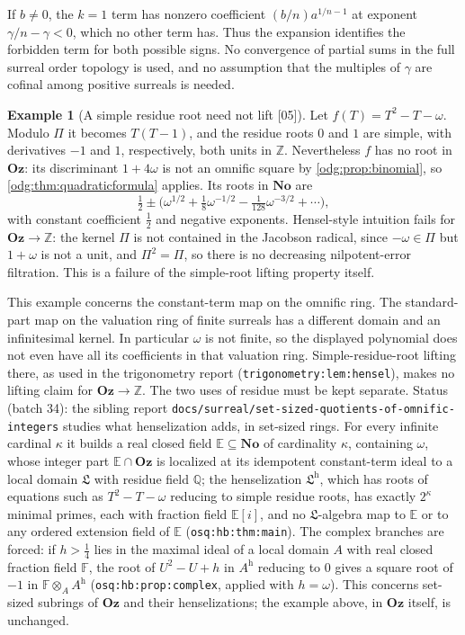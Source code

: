 \documentclass[11pt,oneside]{article}
\numberwithin{equation}{section}
\theoremstyle{definition}
\newtheorem{example}[example]{Example}
\theoremstyle{remark}
\newcommand{\No}{\mathbf{No}}
\newcommand{\Oz}{\mathbf{Oz}}
\newcommand{\Z}{\mathbb Z}
\newcommand{\Q}{\mathbb Q}
\newcommand{\src}[1]{\textup{\textsf{\small[#1]}}}
\newcommand{\replabel}[1]{\nolinkurl{#1}}
\newcommand{\fn}[1]{\nolinkurl{#1}}
\begin{document}
If $b\ne0$, the $k=1$ term has nonzero coefficient
$(b/n)a^{1/n-1}$ at exponent $\gamma/n-\gamma<0$, which no other term has.
Thus the expansion identifies the forbidden term for both possible signs.
No convergence of partial sums in the full surreal order topology is used,
and no assumption that the multiples of $\gamma$ are cofinal among positive
surreals is needed.

\begin{example}[A simple residue root need not lift \src{05}]\label{odg:ex:hensel}
Let $f(T)=T^2-T-\omega$. Modulo $\Pi$ it becomes $T(T-1)$, and the residue
roots $0$ and $1$ are simple, with derivatives $-1$ and $1$, respectively,
both units in $\Z$. Nevertheless $f$ has no root in $\Oz$: its discriminant
$1+4\omega$ is not an omnific square by \cref{odg:prop:binomial}, so
\cref{odg:thm:quadraticformula} applies. Its roots in $\No$ are
\[
 \tfrac12\pm\bigl(\omega^{1/2}+\tfrac18\omega^{-1/2}
 -\tfrac1{128}\omega^{-3/2}+\cdots\bigr),
\]
with constant coefficient $\tfrac12$ and negative exponents. Hensel-style
intuition fails for $\Oz\to\Z$: the kernel $\Pi$ is not contained in the
Jacobson radical, since $-\omega\in\Pi$ but $1+\omega$ is not a unit, and
$\Pi^2=\Pi$, so there is no decreasing nilpotent-error filtration. This is a
failure of the simple-root lifting property itself.
\end{example}

This example concerns the constant-term map on the omnific ring. The
standard-part map on the valuation ring of finite surreals has a different
domain and an infinitesimal kernel. In particular $\omega$ is not finite,
so the displayed polynomial does not even have all its coefficients in
that valuation ring. Simple-residue-root lifting there, as used in the
trigonometry report (\replabel{trigonometry:lem:hensel}), makes no lifting
claim for $\Oz\to\Z$. The two uses of residue must be kept separate.
Status (batch 34): the sibling report
\fn{docs/surreal/set-sized-quotients-of-omnific-integers} studies what
henselization adds, in set-sized rings. For every infinite cardinal $\kappa$
it builds a real closed field $\mathbb E\subseteq\No$ of cardinality $\kappa$,
containing $\omega$, whose integer part $\mathbb E\cap\Oz$ is localized at its
idempotent constant-term ideal to a local domain $\mathfrak L$ with residue
field $\Q$; the henselization $\mathfrak L^{\mathrm h}$, which has roots of
equations such as $T^2-T-\omega$ reducing to simple residue roots, has exactly
$2^\kappa$ minimal primes, each with fraction field $\mathbb E[i]$, and no
$\mathfrak L$-algebra map to $\mathbb E$ or to any ordered extension field of
$\mathbb E$ (\replabel{osq:hb:thm:main}). The complex branches are forced: if
$h>\tfrac14$ lies in the maximal ideal of a local domain $A$ with real closed
fraction field $\mathbb F$, the root of $U^2-U+h$ in $A^{\mathrm h}$ reducing
to $0$ gives a square root of $-1$ in $\mathbb F\otimes_AA^{\mathrm h}$
(\replabel{osq:hb:prop:complex}, applied with $h=\omega$). This concerns
set-sized subrings of $\Oz$ and their henselizations; the example above, in
$\Oz$ itself, is unchanged.
\end{document}
